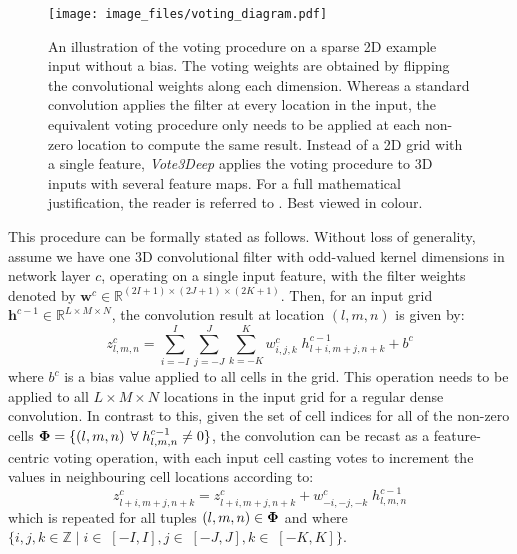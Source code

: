 \documentclass[letterpaper, 10 pt, conference]{tex_style/ieeeconf}
\begin{document}
\begin{figure}[t]
    \centering
    \texttt{[image: image\_files/voting\_diagram.pdf]}
    \caption{An illustration of the voting procedure on a sparse 2D example input without a bias. The voting weights are obtained by flipping the convolutional weights along each dimension. Whereas a standard convolution applies the filter at every location in the input, the equivalent voting procedure only needs to be applied at each non-zero location to compute the same result. Instead of a 2D grid with a single feature, \emph{Vote3Deep} applies the voting procedure to 3D inputs with several feature maps. For a full mathematical justification, the reader is referred to \cite{wang2015voting}. Best viewed in colour.
    \label{fig:voting}
    }
\end{figure}

This procedure can be formally stated as follows.
Without loss of generality, assume we have one 3D convolutional filter with odd-valued kernel dimensions in network layer $c$, operating on a single input feature, with the filter weights denoted by $\mathbf{w}^{c} \in \mathbb{R}^{(2I+1) \times (2J+1) \times (2K+1)}$.
Then, for an input grid $\mathbf{h}^{c-1} \in \mathbb{R}^{L \times M \times N}$, the convolution result at location $(l, m, n)$ is given by:
\begin{equation}
    z_{l, m, n}^{c} = \sum_{i=-I}^{I} \sum_{j=-J}^{J} \sum_{k=-K}^{K} w_{i,j,k}^{c} \; h_{l+i, m+j, n+k}^{c-1} + b^{c}
\end{equation}
\noindent where $b^{c}$ is a bias value applied to all cells in the grid.
This operation needs to be applied to all $L \times M \times N$ locations in the input grid for a regular dense convolution.
In contrast to this, given the set of cell indices for all of the non-zero cells ${\bf\Phi} = \{ \left(l,m,n\right) \; \forall \; h_{l, m, n}^{c-1} \neq 0 \}$, the convolution can be recast as a feature-centric voting operation, with each input cell casting votes to increment the values in neighbouring cell locations according to:
\begin{equation}
    z_{l+i, m+j, n+k}^{c} = z_{l+i, m+j, n+k}^{c} + w_{-i,-j,-k}^{c} \; h_{l, m, n}^{c-1}
\end{equation}
which is repeated for all tuples $ \left(l,m,n\right) \in {\bf\Phi} $ and where $ \{ i, j, k  \in \mathbb{Z} \; | \; i \in \; \left[-I, I\right], j \in \; \left[-J, J\right], k \in \; \left[-K, K\right] \}$.
\end{document}
